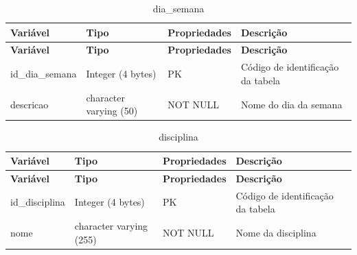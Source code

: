 \fonteautores

\vspace{\baselineskip}

\Needspace{0.32\textheight}
\begin{longtable}{|L{5.2cm}|L{3.2cm}|L{2.4cm}|L{3.4cm}|}
\caption{dia\_semana} \\
\hline
\textbf{Variável} & \textbf{Tipo} & \textbf{Propriedades} & \textbf{Descrição} \\
\hline
\endfirsthead
\hline
\textbf{Variável} & \textbf{Tipo} & \textbf{Propriedades} & \textbf{Descrição} \\
\hline
\endhead
id\_dia\_semana & Integer (4 bytes) & PK & Código de identificação da tabela \\
\hline
descricao & character varying (50) & NOT NULL & Nome do dia da semana \\
\hline
\end{longtable}

\fonteautores

\vspace{\baselineskip}

\Needspace{0.32\textheight}
\begin{longtable}{|L{5.2cm}|L{3.2cm}|L{2.4cm}|L{3.4cm}|}
\caption{disciplina} \\
\hline
\textbf{Variável} & \textbf{Tipo} & \textbf{Propriedades} & \textbf{Descrição} \\
\hline
\endfirsthead
\hline
\textbf{Variável} & \textbf{Tipo} & \textbf{Propriedades} & \textbf{Descrição} \\
\hline
\endhead
id\_disciplina & Integer (4 bytes) & PK & Código de identificação da tabela \\
\hline
nome & character varying (255) & NOT NULL & Nome da disciplina \\
\hline
\end{longtable}

\fonteautores

\vspace{\baselineskip}

